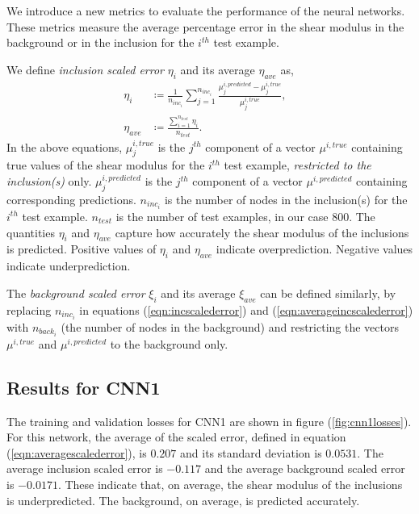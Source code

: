 \documentclass[12pt]{article}
\begin{document}
We introduce a new metrics to evaluate the performance of the neural networks. These metrics measure the average percentage error in the shear modulus in the background or in the inclusion for the $i^{th}$ test example.

We define \textit{inclusion scaled error} $\eta_{i}$ and its average $\eta_{ave}$ as, 
\begin{subequations}
  \begin{align}
  \eta_{i} &\coloneqq \frac{1}{n_{inc_i}}\sum_{j=1}^{n_{inc_i}}\frac{\mu^{i,predicted}_{j}-\mu^{i,true}_{j}}{\mu^{i,true}_{j}},  &\label{eqn:incscalederror}\\
  \eta_{ave} &\coloneqq \frac{\sum_{i=1}^{n_{test}}\eta_{i}}{n_{test}}. &\label{eqn:averageincscalederror}
  \end{align}
\end{subequations}
In the above equations, $\mu_{j}^{i,true}$ is the $j^{th}$ component of a vector $\mu^{i,true}$ containing true values of the shear modulus for the $i^{th}$ test example, \textit{restricted to the inclusion(s)} only. $\mu_{j}^{i,predicted}$ is the $j^{th}$ component of a vector $\mu^{i,predicted}$ containing corresponding predictions. $n_{inc_i}$ is the number of nodes in the inclusion(s) for the $i^{th}$ test example. $n_{test}$ is the number of test examples, in our case $800$. The quantities $\eta_i$ and $\eta_{ave}$ capture how accurately the shear modulus of the inclusions is predicted. Positive values of $\eta_i$ and $\eta_{ave}$ indicate overprediction. Negative values indicate underprediction.

The \textit{background scaled error} $\xi_{i}$ and its average $\xi_{ave}$ can be defined similarly, by replacing $n_{inc_i}$ in equations (\ref{eqn:incscalederror}) and (\ref{eqn:averageincscalederror})  with $n_{back_i}$ (the number of nodes in the background) and restricting the vectors $\mu^{i,true}$ and $\mu^{i,predicted}$ to the background only.
%
\subsection{\label{sect:resultscnn1}Results for CNN1}
%
The training and validation losses for CNN1 are shown in figure (\ref{fig:cnn1losses}). For this network, the average of the scaled error, defined in equation (\ref{eqn:averagescalederror}), is $0.207$ and its standard deviation is $0.0531$. The average inclusion scaled error is $-0.117$ and the average background scaled error is $-0.0171$. These indicate that, on average, the shear modulus of the inclusions is underpredicted. The background, on average, is predicted accurately.
\end{document}
